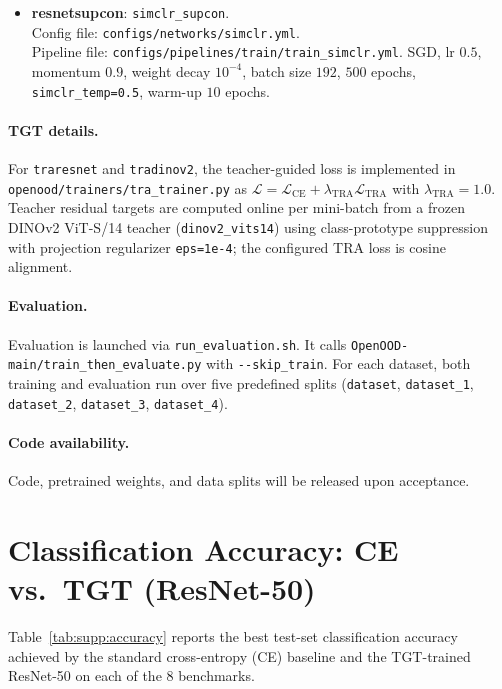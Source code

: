 \documentclass[runningheads]{llncs}
\newcommand{\tabref}[1]{Table~\ref{#1}}
\newcommand{\code}[1]{\nolinkurl{#1}}
\begin{document}
\begin{itemize}
  \item \textbf{resnetsupcon}: \code{simclr_supcon}.\\
  Config file: \code{configs/networks/simclr.yml}.\\
  Pipeline file: \code{configs/pipelines/train/train_simclr.yml}.
  SGD, lr $0.5$, momentum $0.9$, weight decay $10^{-4}$,
  batch size $192$, $500$ epochs,
  \code{simclr_temp=0.5}, warm-up $10$ epochs.
\end{itemize}

\paragraph{TGT details.}
For \code{traresnet} and \code{tradinov2}, the teacher-guided loss is implemented in
\code{openood/trainers/tra_trainer.py} as
$\mathcal{L}=\mathcal{L}_{\mathrm{CE}}+\lambda_{\mathrm{TRA}}\mathcal{L}_{\mathrm{TRA}}$ with
$\lambda_{\mathrm{TRA}}=1.0$.
Teacher residual targets are computed online per mini-batch from a frozen
DINOv2 ViT-S/14 teacher (\code{dinov2_vits14}) using class-prototype suppression
with projection regularizer \code{eps=1e-4}; the configured TRA loss is cosine alignment.

\paragraph{Evaluation.}
Evaluation is launched via \code{run_evaluation.sh}.
It calls \code{OpenOOD-main/train_then_evaluate.py} with \code{--skip_train}.
For each dataset, both training and evaluation run over five predefined splits
(\code{dataset}, \code{dataset_1}, \code{dataset_2}, \code{dataset_3}, \code{dataset_4}).

\paragraph{Code availability.}
Code, pretrained weights, and data splits will be released upon acceptance.

\section{Classification Accuracy: CE vs.\ TGT (ResNet-50)}
\label{sec:supp:accuracy}

\tabref{tab:supp:accuracy} reports the best test-set classification accuracy achieved by
the standard cross-entropy (CE) baseline and the TGT-trained ResNet-50 on each of the
8 benchmarks.
\end{document}
